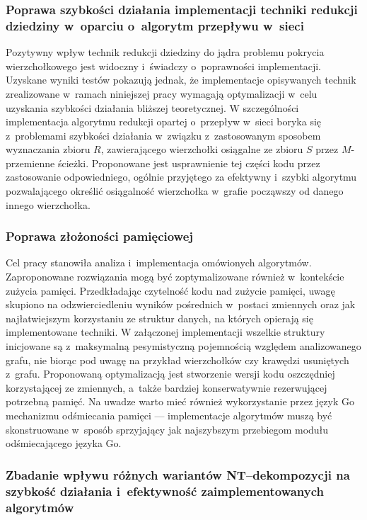   \subsubsection{\textbf{Poprawa szybkości działania implementacji techniki redukcji dziedziny w~oparciu o~algorytm przepływu w~sieci}}

  Pozytywny wpływ technik redukcji dziedziny do jądra problemu pokrycia wierzchołkowego jest widoczny i~świadczy o~poprawności implementacji.
  Uzyskane wyniki testów pokazują jednak, że implementacje opisywanych technik zrealizowane w~ramach niniejszej pracy wymagają optymalizacji w~celu uzyskania szybkości działania bliższej teoretycznej.
  W szczególności implementacja algorytmu redukcji opartej o~przepływ w~sieci boryka się z~problemami szybkości działania w~związku z~zastosowanym sposobem wyznaczania zbioru $R$, zawierającego wierzchołki osiągalne ze zbioru $S$ przez $M$-przemienne ścieżki.
  Proponowane jest usprawnienie tej części kodu przez zastosowanie odpowiedniego, ogólnie przyjętego za efektywny i~szybki algorytmu pozwalającego określić osiągalność wierzchołka w~grafie począwszy od danego innego wierzchołka.

  \subsubsection{\textbf{Poprawa złożoności pamięciowej}}

  Cel pracy stanowiła analiza i~implementacja omówionych algorytmów.
  Zaproponowane rozwiązania mogą być zoptymalizowane również w~kontekście zużycia pamięci.
  Przedkładając czytelność kodu nad zużycie pamięci, uwagę skupiono na odzwierciedleniu wyników pośrednich w~postaci zmiennych oraz jak najłatwiejszym korzystaniu ze struktur danych, na których opierają się implementowane techniki.
  W załączonej implementacji wszelkie struktury inicjowane są z~maksymalną pesymistyczną pojemnością względem analizowanego grafu, nie biorąc pod uwagę na przykład wierzchołków czy krawędzi usuniętych z~grafu.
  Proponowaną optymalizacją jest stworzenie wersji kodu oszczędniej korzystającej ze zmiennych, a~także bardziej konserwatywnie rezerwującej potrzebną pamięć.
  Na uwadze warto mieć również wykorzystanie przez język Go mechanizmu odśmiecania pamięci --- implementacje algorytmów muszą być skonstruowane w~sposób sprzyjający jak najszybszym przebiegom modułu odśmiecającego języka Go.

  \subsubsection{\textbf{Zbadanie wpływu różnych wariantów NT--dekompozycji na szybkość działania i~efektywność zaimplementowanych algorytmów}}

